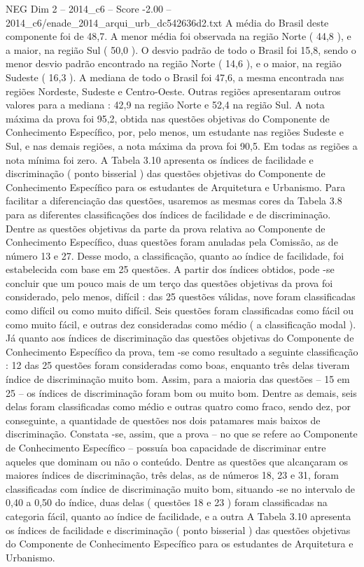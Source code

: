 \begin{textsample}{NEG Dim 2 – 2014\_c6 – Score -2.00 – 2014\_c6/enade\_2014\_arqui\_urb\_dc542636d2.txt}
A média do Brasil deste componente foi de 48,7.
A menor média foi observada na região Norte ( 44,8 ), e a maior, na região Sul ( 50,0 ).
O desvio padrão de todo o Brasil foi 15,8, sendo o menor desvio padrão encontrado na região Norte ( 14,6 ), e o maior, na região Sudeste ( 16,3 ).
A mediana de todo o Brasil foi 47,6, a mesma encontrada nas regiões Nordeste, Sudeste e Centro-Oeste.
Outras regiões apresentaram outros valores para a mediana : 42,9 na região Norte e 52,4 na região Sul.
A nota máxima da prova foi 95,2, obtida nas questões objetivas do Componente de Conhecimento Específico, por, pelo menos, um estudante nas regiões Sudeste e Sul, e nas demais regiões, a nota máxima da prova foi 90,5.
Em todas as regiões a nota mínima foi zero.
A Tabela 3.10 apresenta os índices de facilidade e discriminação ( ponto bisserial ) das questões objetivas do Componente de Conhecimento Específico para os estudantes de Arquitetura e Urbanismo.
Para facilitar a diferenciação das questões, usaremos as mesmas cores da Tabela 3.8 para as diferentes classificações dos índices de facilidade e de discriminação.
Dentre as questões objetivas da parte da prova relativa ao Componente de Conhecimento Específico, duas questões foram anuladas pela Comissão, as de número 13 e 27.
Desse modo, a classificação, quanto ao índice de facilidade, foi estabelecida com base em 25 questões.
A partir dos índices obtidos, pode -se concluir que um pouco mais de um terço das questões objetivas da prova foi considerado, pelo menos, difícil : das 25 questões válidas, nove foram classificadas como difícil ou como muito difícil.
Seis questões foram classificadas como fácil ou como muito fácil, e outras dez consideradas como médio ( a classificação modal ).
Já quanto aos índices de discriminação das questões objetivas do Componente de Conhecimento Específico da prova, tem -se como resultado a seguinte classificação : 12 das 25 questões foram consideradas como boas, enquanto três delas tiveram índice de discriminação muito bom.
Assim, para a maioria das questões – 15 em 25 – os índices de discriminação foram bom ou muito bom.
Dentre as demais, seis delas foram classificadas como médio e outras quatro como fraco, sendo dez, por conseguinte, a quantidade de questões nos dois patamares mais baixos de discriminação.
Constata -se, assim, que a prova – no que se refere ao Componente de Conhecimento Específico – possuía boa capacidade de discriminar entre aqueles que dominam ou não o conteúdo.
Dentre as questões que alcançaram os maiores índices de discriminação, três delas, as de números 18, 23 e 31, foram classificadas com índice de discriminação muito bom, situando -se no intervalo de 0,40 a 0,50 do índice, duas delas ( questões 18 e 23 ) foram classificadas na categoria fácil, quanto ao índice de facilidade, e a outra A Tabela 3.10 apresenta os índices de facilidade e discriminação ( ponto bisserial ) das questões objetivas do Componente de Conhecimento Específico para os estudantes de Arquitetura e Urbanismo.

\end{textsample}
